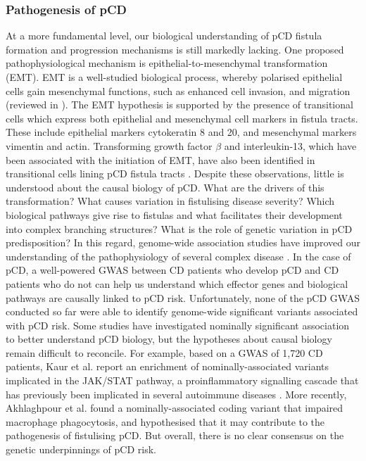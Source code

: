 \subsubsection{Pathogenesis of pCD}
At a more fundamental level, our biological understanding of pCD fistula formation and progression mechanisms is still markedly lacking. One proposed pathophysiological mechanism is epithelial-to-mesenchymal transformation (EMT). EMT is a well-studied biological process, whereby polarised epithelial cells gain mesenchymal functions, such as enhanced cell invasion, and migration (reviewed in \cite{Kalluri2009-uu}). The EMT hypothesis is supported by the presence of transitional cells which express both epithelial and mesenchymal cell markers in fistula tracts. These include epithelial markers cytokeratin 8 and 20, and mesenchymal markers vimentin and actin. Transforming growth factor $\beta$ and interleukin-13, which have been associated with the initiation of EMT, have also been identified in transitional cells lining pCD fistula tracts \cite{Scharl2013-uf,Bataille2008-ej,Bataille2004-vf}. Despite these observations, little is understood about the causal biology of pCD. What are the drivers of this transformation? What causes variation in fistulising disease severity? Which biological pathways give rise to fistulas and what facilitates their development into complex branching structures? What is the role of genetic variation in pCD predisposition? In this regard, genome-wide association studies have improved our understanding of the pathophysiology of several complex disease \cite{Cano-Gamez2020-nm}. In the case of pCD, a well-powered GWAS between CD patients who develop pCD and CD patients who do not can help us understand which effector genes and biological pathways are causally linked to pCD risk. Unfortunately, none of the pCD GWAS conducted so far were able to identify genome-wide significant variants associated with pCD risk. Some studies have investigated nominally significant association to better understand pCD biology, but the hypotheses about causal biology remain difficult to reconcile. For example, based on a GWAS of 1,720 CD patients, Kaur et al. \cite{Kaur2016-bs} report an enrichment of nominally-associated variants implicated in the JAK/STAT pathway, a proinflammatory signalling cascade that has previously been implicated in several autoimmune diseases \cite{Hu2021-us,Seif2017-bk}. More recently, Akhlaghpour et al. \cite{Akhlaghpour2023-jw} found a nominally-associated coding variant that impaired macrophage phagocytosis, and hypothesised that it may contribute to the pathogenesis of fistulising pCD. But overall, there is no clear consensus on the genetic underpinnings of pCD risk.\\

